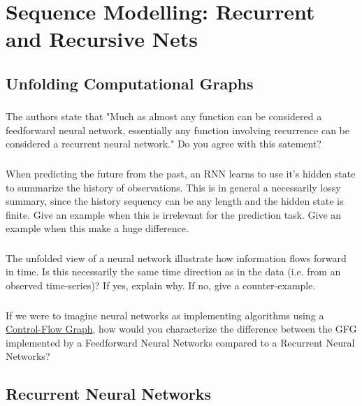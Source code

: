 \documentclass[a4paper]{report}
\begin{document}
\chapter{Sequence Modelling: Recurrent and Recursive Nets}

\section{Unfolding Computational Graphs}

  \subsection{} The authors state that "Much as almost any function can be considered a feedforward neural network, essentially any function involving recurrence can be considered a recurrent neural network." Do you agree with this satement?
  \subsection{} When predicting the future from the past, an RNN learns to use it's hidden state to summarize the history of observations. This is in general a necessarily lossy summary, since the history sequency can be any length and the hidden state is finite. Give an example when this is irrelevant for the prediction task. Give an example when this make a huge difference.
    \subsection{}  The unfolded view of a neural network illustrate how information flows forward in time. Is this necessarily the same time direction as in the data (i.e. from an observed time-series)? If yes, explain why. If no, give a counter-example.
    \subsection{}  If we were to imagine neural networks as implementing algorithms using a \href{https://en.wikipedia.org/wiki/Control-flow_graph}{Control-Flow Graph}, how would you characterize the difference between the GFG implemented by a Feedforward Neural Networks compared to a Recurrent Neural Networks?

\section{Recurrent Neural Networks}
\end{document}

